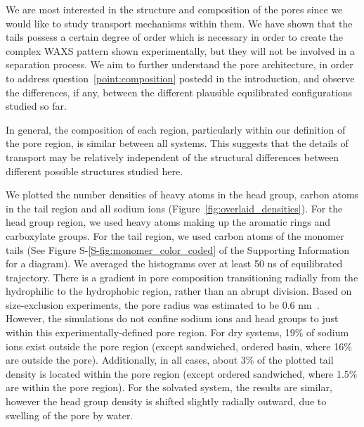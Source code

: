 \documentclass[journal=jpcbfk,manuscript=article]{achemso}
\begin{document}
  We are most interested in the structure and composition of the pores since we
  would like to study transport mechanisms within them. We have shown that the
  tails possess a certain degree of order which is necessary in order to create
  the complex WAXS pattern shown experimentally, but they will not be involved in
  a separation process. We aim to further understand the pore architecture, in
  order to address question~\ref{point:composition} postedd in the introduction, and observe the differences,
  if any, between the different plausible equilibrated configurations studied so far.

  In general, the composition of each region, particularly within our
  definition of the pore region, is similar between all systems.  This suggests
  that the details of transport may be relatively independent of the structural
  differences between different possible structures studied here.
  
  We plotted the number densities of heavy atoms in the head group, carbon atoms in the tail
  region and all sodium ions (Figure~\ref{fig:overlaid_densities}). For the head group
  region, we used heavy atoms making up the aromatic rings and carboxylate groups. For the tail
  region, we used carbon atoms of the monomer tails (See Figure S-\ref{S-fig:monomer_color_coded}
  of the Supporting Information for a diagram). We averaged the histograms over at least 50 ns of equilibrated trajectory.
  There is a gradient in pore composition transitioning radially from the hydrophilic 
  to the hydrophobic region, rather than an abrupt division. Based on size-exclusion 
  experiments, the pore radius was estimated to be 0.6 nm~\cite{zhou_supported_2005}. 
  However, the simulations do not confine
  sodium ions and head groups to just within this experimentally-defined pore region. For dry systems,
  19\% of sodium ions exist outside the pore region (except sandwiched, ordered basin,
  where 16\% are outside the pore). Additionally, in all cases, about 
  3\% of the plotted tail density is located within the pore region (except ordered sandwiched,
  where 1.5\% are within the pore region). For the solvated system, the results are similar,
  however the head group density is shifted slightly radially outward, due to
  swelling of the pore by water. 
  
\end{document}
